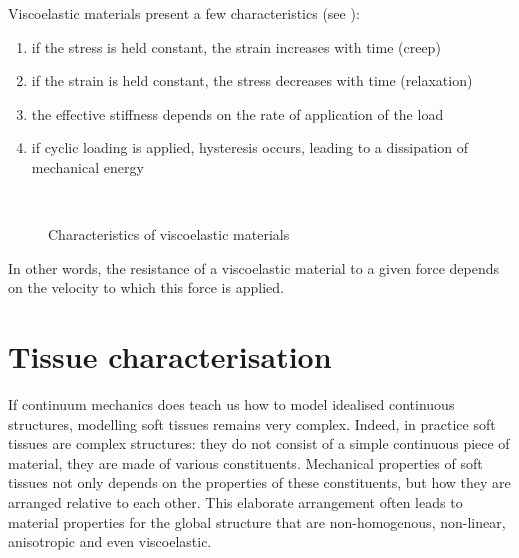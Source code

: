 Viscoelastic materials present a few characteristics (see ): 
\begin{enumerate}
\item if the stress is held constant, the strain increases with time (creep)
\item if the strain is held constant, the stress decreases with time (relaxation)
\item the effective stiffness depends on the rate of application of the load
\item if cyclic loading is applied, hysteresis occurs, leading to a dissipation of mechanical energy
\end{enumerate}
%
\begin{figure}[ht]
\centering 
{}
\hspace{0.5cm}
 \\
\hspace{0.5cm}
\caption[Characteristics of viscoelastic materials]{Characteristics of viscoelastic materials}
\label{chap2:fig-visco}
\end{figure}

In other words, the resistance of a viscoelastic material to a given force depends on the velocity to which this force is applied. 

			
\section{Tissue characterisation}

\ON If continuum mechanics does teach us how to model idealised continuous structures, modelling soft tissues remains very complex. Indeed, in practice soft tissues are complex structures: they do not consist of a simple continuous piece of material, they are made of various constituents. Mechanical properties of soft tissues not only depends on the properties of these constituents, but how they are arranged relative to each other. This elaborate arrangement often leads to material properties for the global structure that are non-homogenous, non-linear, anisotropic and even viscoelastic.

